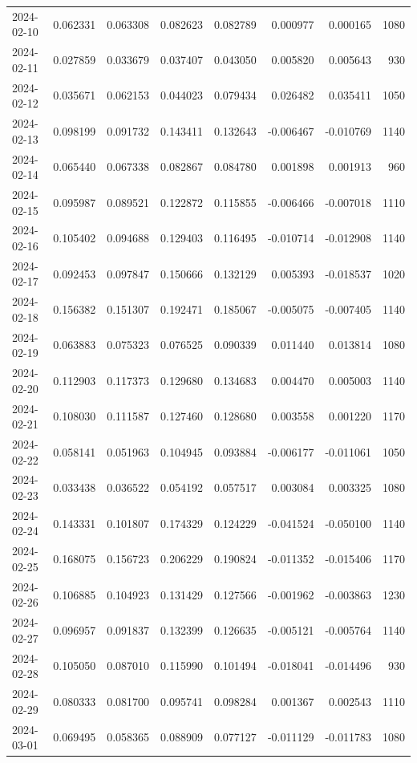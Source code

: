 \begin{tabular}{lrrrrrrr}
2024-02-10 & 0.062331 & 0.063308 & 0.082623 & 0.082789 & 0.000977 & 0.000165 & 1080 \\
2024-02-11 & 0.027859 & 0.033679 & 0.037407 & 0.043050 & 0.005820 & 0.005643 & 930 \\
2024-02-12 & 0.035671 & 0.062153 & 0.044023 & 0.079434 & 0.026482 & 0.035411 & 1050 \\
2024-02-13 & 0.098199 & 0.091732 & 0.143411 & 0.132643 & -0.006467 & -0.010769 & 1140 \\
2024-02-14 & 0.065440 & 0.067338 & 0.082867 & 0.084780 & 0.001898 & 0.001913 & 960 \\
2024-02-15 & 0.095987 & 0.089521 & 0.122872 & 0.115855 & -0.006466 & -0.007018 & 1110 \\
2024-02-16 & 0.105402 & 0.094688 & 0.129403 & 0.116495 & -0.010714 & -0.012908 & 1140 \\
2024-02-17 & 0.092453 & 0.097847 & 0.150666 & 0.132129 & 0.005393 & -0.018537 & 1020 \\
2024-02-18 & 0.156382 & 0.151307 & 0.192471 & 0.185067 & -0.005075 & -0.007405 & 1140 \\
2024-02-19 & 0.063883 & 0.075323 & 0.076525 & 0.090339 & 0.011440 & 0.013814 & 1080 \\
2024-02-20 & 0.112903 & 0.117373 & 0.129680 & 0.134683 & 0.004470 & 0.005003 & 1140 \\
2024-02-21 & 0.108030 & 0.111587 & 0.127460 & 0.128680 & 0.003558 & 0.001220 & 1170 \\
2024-02-22 & 0.058141 & 0.051963 & 0.104945 & 0.093884 & -0.006177 & -0.011061 & 1050 \\
2024-02-23 & 0.033438 & 0.036522 & 0.054192 & 0.057517 & 0.003084 & 0.003325 & 1080 \\
2024-02-24 & 0.143331 & 0.101807 & 0.174329 & 0.124229 & -0.041524 & -0.050100 & 1140 \\
2024-02-25 & 0.168075 & 0.156723 & 0.206229 & 0.190824 & -0.011352 & -0.015406 & 1170 \\
2024-02-26 & 0.106885 & 0.104923 & 0.131429 & 0.127566 & -0.001962 & -0.003863 & 1230 \\
2024-02-27 & 0.096957 & 0.091837 & 0.132399 & 0.126635 & -0.005121 & -0.005764 & 1140 \\
2024-02-28 & 0.105050 & 0.087010 & 0.115990 & 0.101494 & -0.018041 & -0.014496 & 930 \\
2024-02-29 & 0.080333 & 0.081700 & 0.095741 & 0.098284 & 0.001367 & 0.002543 & 1110 \\
2024-03-01 & 0.069495 & 0.058365 & 0.088909 & 0.077127 & -0.011129 & -0.011783 & 1080 \\

\end{tabular}
